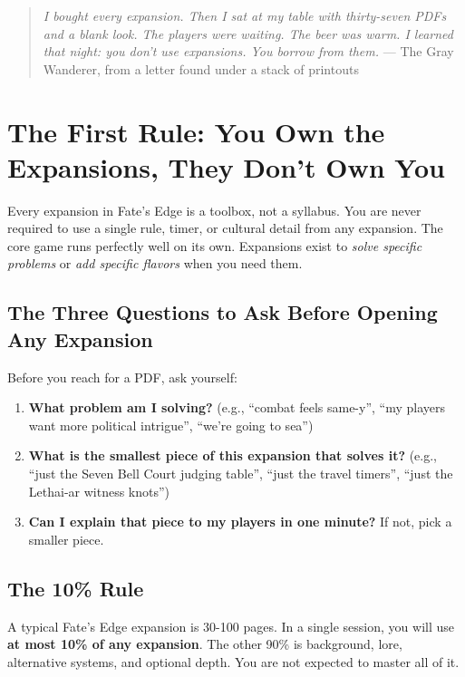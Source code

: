 \begin{quote}
\small
\textit{\textquotedbl I bought every expansion. Then I sat at my table with thirty-seven PDFs and a blank look. The players were waiting. The beer was warm. I learned that night: you don't use expansions. You borrow from them.\textquotedbl}
--- The Gray Wanderer, from a letter found under a stack of printouts
\end{quote}

\section{The First Rule: You Own the Expansions, They Don't Own You}

Every expansion in Fate's Edge is a toolbox, not a syllabus. You are never required to use a single rule, timer, or cultural detail from any expansion. The core game runs perfectly well on its own. Expansions exist to \emph{solve specific problems} or \emph{add specific flavors} when you need them.

\subsection{The Three Questions to Ask Before Opening Any Expansion}

Before you reach for a PDF, ask yourself:

\begin{enumerate}
\item \textbf{What problem am I solving?} (e.g., ``combat feels same-y'', ``my players want more political intrigue'', ``we're going to sea'')
\item \textbf{What is the smallest piece of this expansion that solves it?} (e.g., ``just the Seven Bell Court judging table'', ``just the travel timers'', ``just the Lethai-ar witness knots'')
\item \textbf{Can I explain that piece to my players in one minute?} If not, pick a smaller piece.
\end{enumerate}

\subsection{The 10\% Rule}

A typical Fate's Edge expansion is 30-100 pages. In a single session, you will use \textbf{at most 10\% of any expansion}. The other 90\% is background, lore, alternative systems, and optional depth. You are not expected to master all of it.

